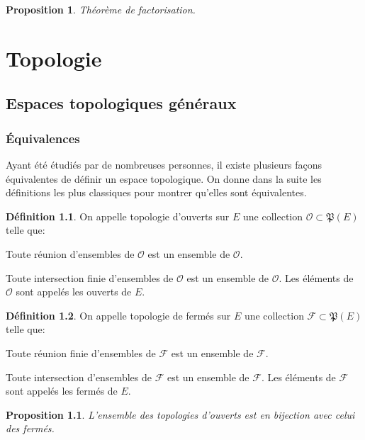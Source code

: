 \documentclass[a4paper, 11pt, french]{book}
\newenvironment{itemise}{\itemize}{\enditemize}
\let\colour=\color
\theoremstyle{plain} %
\newtheorem{proposition}{Proposition}
\theoremstyle{definition} %
\newtheorem{definition}{Définition}
\theoremstyle{remark} %
\newcommand{\1}{\mathds{1}}
\renewcommand{\frak}[1]{\mathfrak{#1}}
\newcommand{\scr}[1]{\mathscr{#1}}
\begin{document}
\begin{proposition}
	Théorème de factorisation.
	\colour{red}{À compléter !}
\end{proposition}

\part{Topologie}

\chapter{Espaces topologiques généraux}

\section{Équivalences}

Ayant été étudiés par de nombreuses personnes, il existe plusieurs façons équivalentes de définir un espace topologique.
On donne dans la suite les définitions les plus classiques pour montrer qu'elles sont équivalentes.

\begin{definition}
	On appelle topologie d'ouverts sur $E$ une collection $\scr{O}\subset\frak{P}(E)$ telle que:
	\begin{itemise}
		\item Toute réunion d'ensembles de $\scr{O}$ est un ensemble de $\scr{O}$.
		\item Toute intersection finie d'ensembles de $\scr{O}$ est un ensemble de $\scr{O}$.
	\end{itemise}
	Les éléments de $\scr{O}$ sont appelés les ouverts de $E$.
\end{definition}

\begin{definition}
	On appelle topologie de fermés sur $E$ une collection $\scr{F}\subset\frak{P}(E)$ telle que:
	\begin{itemise}
		\item Toute réunion finie d'ensembles de $\scr{F}$ est un ensemble de $\scr{F}$.
		\item Toute intersection d'ensembles de $\scr{F}$ est un ensemble de $\scr{F}$.
	\end{itemise}
	Les éléments de $\scr{F}$ sont appelés les fermés de $E$.
\end{definition}

\begin{proposition}
	L'ensemble des topologies d'ouverts est en bijection avec celui des fermés.
\end{proposition}
\end{document}
